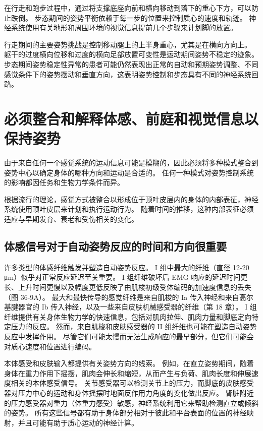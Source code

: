 在行走和跑步过程中，通过将支撑底座向前和横向移动到落下的重心下方，可以防止跌倒。 步态期间的姿势平衡依赖于每一步的位置来控制质心的速度和轨迹。 神经系统使用有关地形和周围环境的视觉信息提前几个步骤来计划脚的放置。

行走期间的主要姿势挑战是控制移动腿上的上半身重心，尤其是在横向方向上。 躯干的过度横向位移和过度的横向足部放置可变性是运动期间姿势不稳定的迹象。 步态期间姿势稳定性异常的患者可能仍然表现出正常的自动和预期姿势调整、不同感觉条件下的姿势摆动和垂直方向，这表明姿势控制和步态具有不同的神经系统回路。


\section{必须整合和解释体感、前庭和视觉信息以保持姿势}
由于来自任何一个感觉系统的运动信息可能是模糊的，因此必须将多种模式整合到姿势中心以确定身体的哪种方向和运动是合适的。 任何一种模式对姿势控制系统的影响都因任务和生物力学条件而异。

根据流行的理论，感觉方式被整合以形成位于顶叶皮层内的身体的内部表征，神经系统使用顶叶皮层来计划和执行运动行为。 随着时间的推移，这种内部表征必须适应与早期发育、衰老和受伤相关的变化。

\subsection{体感信号对于自动姿势反应的时间和方向很重要}
许多类型的体感纤维触发并塑造自动姿势反应。 I 组中最大的纤维（直径 12-20 μm）似乎对正常反应延迟至关重要。 I 组纤维破坏后 EMG 响应的延迟时间更长、上升时间更慢以及幅度更低反映了由肌梭初级受体编码的加速度信息的丢失（图 36-9A）。 最大和最快传导的感觉纤维是来自肌梭的 Ia 传入神经和来自高尔基腱器官的 Ib 传入神经，以及一些来自皮肤机械感受器的纤维（第 18 章）。 I 组纤维提供有关身体生物力学的快速信息，包括对肌肉拉伸、肌肉力量和脚底定向特定压力的反应。 然而，来自肌梭和皮肤感受器的 II 组纤维也可能在塑造自动姿势反应中发挥作用。 尽管它们可能太慢而无法生成响应的最早部分，但它们可能会对质心速度和位置进行编码。

本体感受和皮肤输入都提供有关姿势方向的线索。 例如，在直立姿势期间，随着身体在重力作用下摇摆，肌肉会伸长和缩短，从而产生与负荷、肌肉长度和伸展速度相关的本体感受信号。 关节感受器可以检测关节上的压力，而脚底的皮肤感受器对压力中心的运动和身体摇摆时地面反作用力角度的变化做出反应。 肾脏附近的压力感受器对重力（体重力感受）敏感，神经系统利用它来帮助检测直立或倾斜的姿势。 所有这些信号都有助于身体部分相对于彼此和平台表面的位置的神经映射，并且可能有助于质心运动的神经计算。

